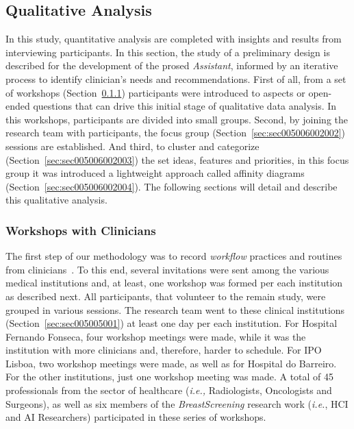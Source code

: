 \subsection{Qualitative Analysis}
\label{sec:sec005006002}

In this study, quantitative analysis are completed with insights and results from interviewing participants.
In this section, the study of a preliminary design is described for the development of the prosed {\it Assistant}, informed by an iterative process to identify clinician's needs and recommendations.
First of all, from a set of workshops (Section~\ref{sec:sec005006002001}) participants were introduced to aspects or open-ended questions that can drive this initial stage of qualitative data analysis.
In this workshops, participants are divided into small groups.
Second, by joining the research team with participants, the focus group (Section~\ref{sec:sec005006002002}) sessions are established.
And third, to cluster and categorize (Section~\ref{sec:sec005006002003}) the set ideas, features and priorities, in this focus group it was introduced a lightweight approach called affinity diagrams (Section~\ref{sec:sec005006002004}).
The following sections will detail and describe this qualitative analysis.

\subsubsection{Workshops with Clinicians}
\label{sec:sec005006002001}

The first step of our methodology was to record {\it workflow} practices and routines from clinicians~\cite{Hoiseth:2013:DHG:2485760.2485770, Hoiseth:2013:RGD:2468356.2468436}.
To this end, several invitations were sent among the various medical institutions and, at least, one workshop was formed per each institution as described next.
All participants, that volunteer to the remain study, were grouped in various sessions.
The research team went to these clinical institutions (Section~\ref{sec:sec005005001}) at least one day per each institution.
For Hospital Fernando Fonseca, four workshop meetings were made, while it was the institution with more clinicians and, therefore, harder to schedule.
For IPO Lisboa, two workshop meetings were made, as well as for Hospital do Barreiro.
For the other institutions, just one workshop meeting was made.
A total of 45 professionals from the sector of healthcare ({\it i.e.,} Radiologists, Oncologists and Surgeons), as well as six members of the {\it BreastScreening} research work ({\it i.e.}, \ac{HCI} and \ac{AI} Researchers) participated in these series of workshops.

